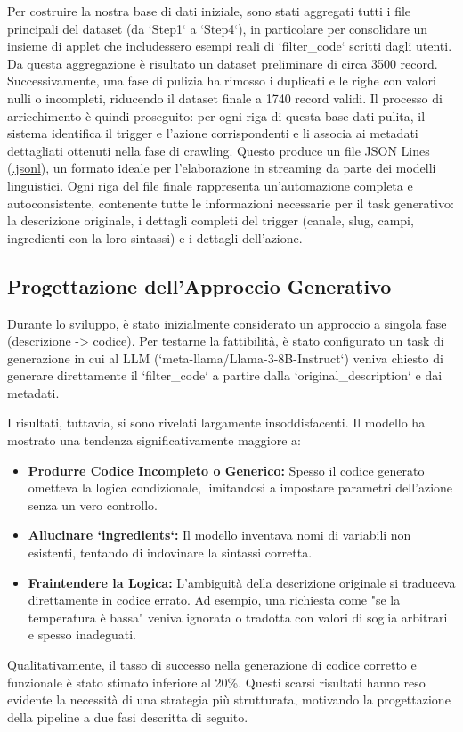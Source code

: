 \documentclass[sigconf,natbib=false]{acmart}
\begin{document}
Per costruire la nostra base di dati iniziale, sono stati aggregati tutti i file principali del dataset (da `Step1` a `Step4`), in particolare per consolidare un insieme di applet che includessero esempi reali di `filter\_code` scritti dagli utenti. Da questa aggregazione è risultato un dataset preliminare di circa 3500 record. Successivamente, una fase di pulizia ha rimosso i duplicati e le righe con valori nulli o incompleti, riducendo il dataset finale a 1740 record validi. Il processo di arricchimento è quindi proseguito: per ogni riga di questa base dati pulita, il sistema identifica il trigger e l'azione corrispondenti e li associa ai metadati dettagliati ottenuti nella fase di crawling. Questo produce un file JSON Lines (\url{.jsonl}), un formato ideale per l'elaborazione in streaming da parte dei modelli linguistici. Ogni riga del file finale rappresenta un'automazione completa e autoconsistente, contenente tutte le informazioni necessarie per il task generativo: la descrizione originale, i dettagli completi del trigger (canale, slug, campi, ingredienti con la loro sintassi) e i dettagli dell'azione.

\subsection{Progettazione dell'Approccio Generativo}
Durante lo sviluppo, è stato inizialmente considerato un approccio a singola fase (descrizione -> codice). Per testarne la fattibilità, è stato configurato un task di generazione in cui al LLM (`meta-llama/Llama-3-8B-Instruct`) veniva chiesto di generare direttamente il `filter\_code` a partire dalla `original\_description` e dai metadati.

I risultati, tuttavia, si sono rivelati largamente insoddisfacenti. Il modello ha mostrato una tendenza significativamente maggiore a:
\begin{itemize}
    \item \textbf{Produrre Codice Incompleto o Generico:} Spesso il codice generato ometteva la logica condizionale, limitandosi a impostare parametri dell'azione senza un vero controllo.
    \item \textbf{Allucinare `ingredients`:} Il modello inventava nomi di variabili non esistenti, tentando di indovinare la sintassi corretta.
    \item \textbf{Fraintendere la Logica:} L'ambiguità della descrizione originale si traduceva direttamente in codice errato. Ad esempio, una richiesta come "se la temperatura è bassa" veniva ignorata o tradotta con valori di soglia arbitrari e spesso inadeguati.
\end{itemize}
Qualitativamente, il tasso di successo nella generazione di codice corretto e funzionale è stato stimato inferiore al 20\%. Questi scarsi risultati hanno reso evidente la necessità di una strategia più strutturata, motivando la progettazione della pipeline a due fasi descritta di seguito.
\end{document}
